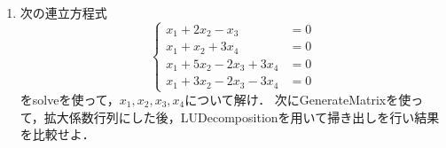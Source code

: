 \begin{enumerate}
\item 
次の連立方程式 
\begin{equation*}
\left\{
\begin{array}{cc}
x _{1}+2 x _{2}-x _{3} & =0\\
x _{1}+x _{2}+3 x _{4}&=0    \\
x _{1}+5 x _{2}-2 x _{3}+3 x _{4}&=0  \\
x _{1}+3 x _{2}-2 x _{3}- 3 x _{4}&=0 
\end{array}
 \right.
\end{equation*}
をsolveを使って，$x_1, x_2, x_3, x_4$について解け．
次にGenerateMatrixを使って，拡大係数行列にした後，LUDecompositionを用いて掃き出しを行い結果を比較せよ．
\end{enumerate}